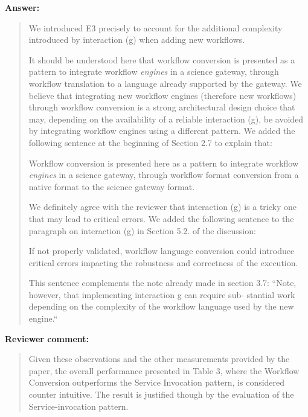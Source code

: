 \documentclass[a4]{article}
\newenvironment{review}%
{\textbf{Reviewer comment:}\begin{quote}}%
{\end{quote}}%
\newenvironment{answer}%
{\textbf{Answer:}\begin{small}\begin{quote}}%
{\end{quote}\end{small}}%
\newcommand{\revised}[1]{\color{blue} #1\color{black}}
\begin{document}
\begin{answer}
  We introduced E3 precisely to account for the additional
  complexity introduced by interaction (g) when adding new
  workflows. 
  
  It should be understood here that workflow conversion is
  presented as a pattern to integrate workflow \emph{engines} in a
  science gateway, through workflow translation to a language already
  supported by the gateway. We believe that integrating new workflow
  engines (therefore new workflows) through workflow conversion is a
  strong architectural design choice that may, depending on the
  availability of a reliable interaction (g), be avoided by
  integrating workflow engines using a different pattern. We added the following sentence at the beginning of Section 2.7 to explain that:
  
  \revised{Workflow conversion is presented here as a pattern to
integrate workflow \emph{engines} in a science gateway, through
workflow format conversion from a native format to the science gateway
format.}


We definitely agree with the reviewer that interaction (g) is
  a tricky one that may lead to critical errors. We added the
  following sentence to the paragraph on interaction (g) in Section
  5.2. of the discussion:

\revised{If not properly validated, workflow language conversion
  could introduce critical errors impacting the robustness and
  correctness of the execution. }

This sentence complements the note already made in section 3.7:
``Note, however,
that implementing interaction g can require sub-
stantial work depending on the complexity of the
workflow language used by the new engine.``
\end{answer}

\begin{review}
 Given these observations and the other measurements provided by the paper, the overall performance presented in Table 3, where the Workflow Conversion outperforms the Service Invocation pattern, is considered counter intuitive. The result is justified though by the evaluation of the Service-invocation pattern.
\end{review}
\end{document}
